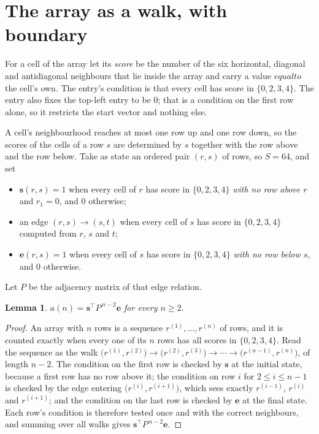 \documentclass[11pt,a4paper]{article}
\theoremstyle{plain}
\newtheorem{lemma}[theorem]{Lemma}
\theoremstyle{definition}
\begin{document}
\section{The array as a walk, with boundary}

For a cell of the array let its \emph{score} be the number of the six horizontal, diagonal and antidiagonal neighbours that lie inside
the array and carry a value $equal to$ the cell's own. The entry's condition is that every cell
has score in $\{0,2,3,4\}$. The entry also fixes the top-left entry to be $0$; that is a condition on the first row alone, so it restricts the start vector and nothing else.

A cell's neighbourhood reaches at most one row up and one row down, so the scores of the
cells of a row $s$ are determined by $s$ together with the row above and the row below.
Take as state an ordered pair $(r,s)$ of rows, so $S=64$, and set
\begin{itemize}
\item $\mathbf{s}(r,s)=1$ when every cell of $r$ has score in $\{0,2,3,4\}$ \emph{with no row
above $r$} and $r_1=0$, and $0$ otherwise;
\item an edge $(r,s)\to(s,t)$ when every cell of $s$ has score in $\{0,2,3,4\}$ computed from
$r$, $s$ and $t$;
\item $\mathbf{e}(r,s)=1$ when every cell of $s$ has score in $\{0,2,3,4\}$ \emph{with no row
below $s$}, and $0$ otherwise.
\end{itemize}
Let $P$ be the adjacency matrix of that edge relation.

\begin{lemma}\label{lem:walk}
$a(n)=\mathbf{s}^{\!\top}P^{\,n-2}\mathbf{e}$ for every $n\ge2$.
\end{lemma}

\begin{proof}
An array with $n$ rows is a sequence $r^{(1)},\dots,r^{(n)}$ of rows, and it is counted
exactly when every one of its $n$ rows has all scores in $\{0,2,3,4\}$. Read the sequence as the
walk $\bigl(r^{(1)},r^{(2)}\bigr)\to\bigl(r^{(2)},r^{(3)}\bigr)\to\cdots\to
\bigl(r^{(n-1)},r^{(n)}\bigr)$, of length $n-2$. The condition on the first row is
checked by $\mathbf{s}$ at the initial state, because a first row has no row above it; the
condition on row $i$ for $2\le i\le n-1$ is checked by the edge entering
$\bigl(r^{(i)},r^{(i+1)}\bigr)$, which sees exactly $r^{(i-1)}$, $r^{(i)}$ and
$r^{(i+1)}$; and the condition on the last row is checked by $\mathbf{e}$ at the final
state. Each row's condition is therefore tested once and with the correct neighbours, and
summing over all walks gives $\mathbf{s}^{\!\top}P^{\,n-2}\mathbf{e}$.
\end{proof}
\end{document}
